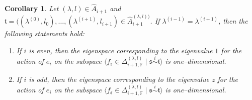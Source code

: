 \documentclass[11pt,a4paper,reqno,svgnames]{amsart}
\theoremstyle{plain}
\newtheorem{corollary}[theorem]{Corollary}
\theoremstyle{definition}
\numberwithin{equation}{section}
\begin{document}
\begin{corollary}
Let $(\lambda,l)\in\hat{A}_{i+1}$ and $\mathfrak{t}=((\lambda^{(0)},l_0),\ldots,(\lambda^{(i+1)},l_{i+1}) \in\hat{A}_{i+1}^{(\lambda,l))}$. If  $\lambda^{(i-1)}=\lambda^{(i+1)}$,  then the following statements hold:
\begin{enumerate}[label=(\arabic{*}), ref=\arabic{*},leftmargin=0pt,itemindent=1.5em]
\item  If $i$ is even, then the eigenspace corresponding to the eigenvalue $1$ for the action of $e_i$ on the subspace $\langle f_\mathfrak{s}\in\Delta_{i+1,\mathbb{F}}^{(\lambda,l)}\mid \mathfrak{s}\stackrel{i}{\sim}\mathfrak{t}\rangle$  is one--dimensional. 
\item If $i$ is odd, then the eigenspace corresponding to the  eigenvalue $z$ for the action of $e_i$ on the subspace $\langle f_\mathfrak{s}\in\Delta_{i+1,\mathbb{F}}^{(\lambda,l)}\mid \mathfrak{s}\stackrel{i}{\sim}\mathfrak{t}\rangle$  is one--dimensional. 
\end{enumerate}
\end{corollary}
\end{document}
